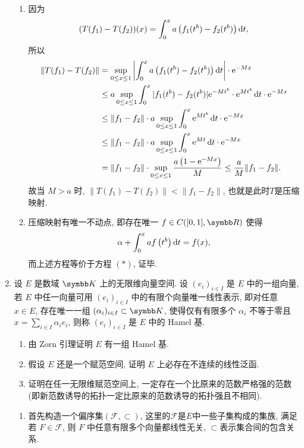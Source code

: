 \begin{enumerate}
\begin{answer}
\begin{enumerate}
        \item 因为
        \[(T(f_1)-T(f_2))(x)=\int_0^xa\left(f_1(t^b)-f_2(t^b)\right)\mathop{}\!\mathrm{d} t,\]
        所以
        \begin{align*}
            \|T(f_1)-T(f_2)\| & =\sup\limits_{0\leq x\leq 1}\left|\int_0^x a\left(f_1(t^b)-f_2(t^b)\right)\mathop{}\!\mathrm{d} t\right|\cdot \mathrm{e}^{-Mx}\\
                              & \leq a\sup\limits_{0\leq x\leq 1}\int_0^x|f_1(t^b)-f_2(t^b)|\mathrm{e}^{-Mt^b}\cdot \mathrm{e}^{Mt^b}\mathop{}\!\mathrm{d} t\cdot \mathrm{e}^{-Mx}\\
                              & \leq\|f_1-f_2\|\cdot a\sup\limits_{0\leq x\leq 1}\int_0^x \mathrm{e}^{Mt^b}\mathop{}\!\mathrm{d} t\cdot \mathrm{e}^{-Mx}\\
                              & \leq\|f_1-f_2\|\cdot a\sup\limits_{0\leq x\leq 1}\int_0^x \mathrm{e}^{Mt}\mathop{}\!\mathrm{d} t\cdot \mathrm{e}^{-Mx}\\
                              & =\|f_1-f_2\|\cdot\sup\limits_{0\leq x\leq 1}\frac{a\left(1-\mathrm{e}^{-Mx}\right)}{M}\leq\frac{a}{M}\|f_1-f_2\|.
        \end{align*}
        故当 $M>a$ 时, $\|T(f_1)-T(f_2)\|<\|f_1-f_2\|$, 也就是此时$T$是压缩映射.
        
        \item 压缩映射有唯一不动点, 即存在唯一 $f\in C([0,1],\R )$ 使得
        \[\alpha+\int_0^xaf\left(t^b\right)\mathop{}\!\mathrm{d} t=f(x),\]
        而上述方程等价于方程 $(*)$, 证毕.
      \end{enumerate}
    \end{answer}
  \item 设 $E$ 是数域 $\K$ 上的无限维向量空间. 设 $(e_i)_{i\in I}$
  是 $E$ 中的一组向量, 若 $E$ 中任一向量可用 $(e_i)_{i\in I}$
  中的有限个向量唯一线性表示, 即对任意 $x\in E$, 存在唯一一组 $(\alpha_i)_{i\in I}\subset\K$,
  使得仅有有限多个 $\alpha_i$ 不等于零且 $x=\sum_{i\in I}\alpha_ie_i$,
  则称 $(e_i)_{i\in I}$ 是 $E$ 中的 Hamel 基.
    \begin{enumerate}
        \item 由 Zorn 引理证明 $E$ 有一组 Hamel 基.
        \item 假设 $E$ 还是一个赋范空间, 证明 $E$ 上必存在不连续的线性泛函.
        \item 证明在任一无限维赋范空间上, 一定存在一个比原来的范数严格强的范数
              (即新范数诱导的拓扑一定比原来的范数诱导的拓扑强且不相同).
    \end{enumerate}
    \begin{answer}
      \begin{enumerate}
        \item 首先构造一个偏序集$(\mathcal{F},\subset)$, 这里的$\mathcal{F}$是$E$中一些子集构成的集族,
        满足若 $F\in\mathcal{F}$, 则 $F$ 中任意有限多个向量都线性无关, $\subset$表示集合间的包含关系.
        

\end{enumerate}
\end{answer}
\end{enumerate}
